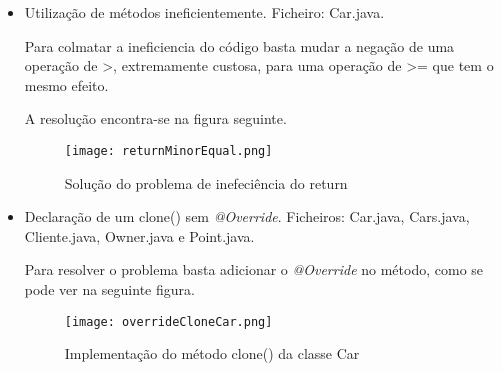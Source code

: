\begin{itemize}
\item Utilização de métodos ineficientemente.\newline
 Ficheiro: Car.java.\newline


\par Para colmatar a ineficiencia do código basta mudar a negação de uma operação de >, extremamente custosa, para uma operação de >= que tem o mesmo efeito.\newline
\par A resolução encontra-se na figura seguinte. 
\begin{figure}[H]

  \centering

  \texttt{[image: returnMinorEqual.png]}

  \caption {Solução do problema de inefeciência do return}

  \label {fig19}

\end{figure}

\end{itemize}

\begin{itemize}
\item Declaração de um clone() sem \textit{@Override}.\newline
 Ficheiros: Car.java, Cars.java, Cliente.java, Owner.java e Point.java.\newline


\par Para resolver o problema basta adicionar o \textit{@Override} no método, como se pode ver na seguinte figura.\newline

\begin{figure}[H]

  \centering

  \texttt{[image: overrideCloneCar.png]}


  \caption {Implementação do método clone() da classe Car}

  \label {fig20}

\end{figure}

\end{itemize}


